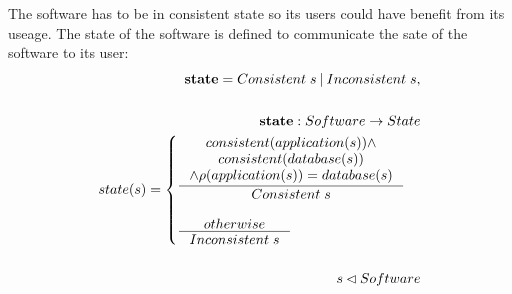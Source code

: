 \documentclass[11pt]{article}
\begin{document}
The software has to be in consistent state so its users could have benefit from its useage. The state of the software is defined to communicate the sate of the software to its user:
\begin{align*}
 	\mathbf{state} = Consistent\; s \: | \: Inconsistent \; s, \\\\
	\mathbf{state} : Software \rightarrow State \\
	state(s) = \begin{cases}
 		\inference{consistent(application(s)) \wedge \\ consistent(database(s)) \\ \wedge \rho(application(s)) = database(s)}{Consistent \; s}\\ \\
 		\inference{otherwise}{Inconsistent \; s}
 	\end{cases} \\ \\
 	s \lhd Software  
\end{align*}
\end{document}
